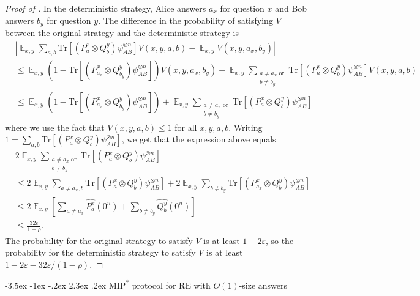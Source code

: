 \documentclass[11pt]{article}
\makeatletter
\renewcommand{\section}{\@startsection {section}{1}{\z@}%
             {-3.5ex \@plus -1ex \@minus -.2ex}%
             {2.3ex \@plus .2ex}%
             {\normalfont\Large\scshape\bfseries}}
\theoremstyle{plain}
\theoremstyle{definition}
\newcommand {\br} [1] {\ensuremath{ \left( #1 \right) }}
\newcommand {\Br} [1] {\ensuremath{ \left[ #1 \right] }}
\DeclareMathOperator*{\bigE}{\mathbb{E}}
\newcommand {\Tr} {\ensuremath{ \mathrm{Tr} }}
\newcommand{\ep} {\ensuremath{\varepsilon}}
\newcommand{\1}{\mathbb{1}} %
\newcommand{\MIP}{\mathrm{MIP}}
\newcommand{\RE}{\mathrm{RE}}
\makeatother
\begin{document}
\begin{proof}[Proof of ]
In the deterministic strategy, Alice answers $a_x$ for question $x$ and Bob answers $b_y$ for question $y$.
The difference in the probability of satisfying $V$ between the original strategy and the deterministic strategy is 
\begin{align*}
    &\left| \bigE_{x,y} \sum_{a,b} \Tr\Br{ \br{P^x_a \otimes Q^y_b} \psi_{AB}^{\otimes n}}V(x,y,a,b) -
    \bigE_{x,y} V(x,y,a_x,b_y)\right| \\
    &\leq \bigE_{x,y} \br{ 1 - \Tr\Br{ \br{P^x_{a_x} \otimes Q^y_{b_y}} \psi_{AB}^{\otimes n}}}V(x,y,a_x,b_y)
    + \bigE_{x,y} \sum_{\substack{a \neq a_x \text{ or}\\ b \neq b_y}}
    \Tr\Br{ \br{P^x_a \otimes Q^y_b} \psi_{AB}^{\otimes n}} V(x,y,a,b) \\
    &\leq \bigE_{x,y} \br{ 1 - \Tr\Br{ \br{P^x_{a_x} \otimes Q^y_{b_y}} \psi_{AB}^{\otimes n}}}
    + \bigE_{x,y} \sum_{\substack{a \neq a_x \text{ or}\\ b \neq b_y}}
    \Tr\Br{ \br{P^x_a \otimes Q^y_b} \psi_{AB}^{\otimes n}}
\end{align*}
where we use the fact that $V(x,y,a,b) \leq 1$ for all $x,y,a,b$.
Writing $1 = \sum_{a,b} \Tr\Br{ \br{P^x_{a} \otimes Q^y_{b}} \psi_{AB}^{\otimes n}}$, we get that the expression above equals
\begin{align*}
    &2 \bigE_{x,y}  \sum_{\substack{a \neq a_x \text{ or}\\ b \neq b_y}}
    \Tr\Br{ \br{P^x_a \otimes Q^y_b} \psi_{AB}^{\otimes n}} \\
    &\leq 2 \bigE_{x,y} \sum_{a \neq a_x,b} \Tr\Br{ \br{P^x_a \otimes Q^y_b} \psi_{AB}^{\otimes n}}
    + 2 \bigE_{x,y} \sum_{b \neq b_y}  \Tr\Br{ \br{P^x_{a_x} \otimes Q^y_b} \psi_{AB}^{\otimes n}} \\
    &\leq 2 \bigE_{x,y} \Br{\sum_{a \neq a_x} \widehat{P^x_a}(0^n) + \sum_{b\neq b_y} \widehat{Q^y_b}(0^n)} \\
    & \leq \frac{32\epsilon}{1-\rho}.
\end{align*}
The probability for the original strategy to satisfy $V$ is at least $1 - 2\ep$, 
so the probability for the deterministic strategy to satisfy $V$ is at least $1 - 2\ep- 32\ep/(1-\rho)$. 
\end{proof}

%
\section{\texorpdfstring{$\MIP^\ast$}{MIP*} protocol for \texorpdfstring{$\RE$}{RE} with \texorpdfstring{$O(1)$}{O(1)}-size answers}
\label{sec:re}
\end{document}
